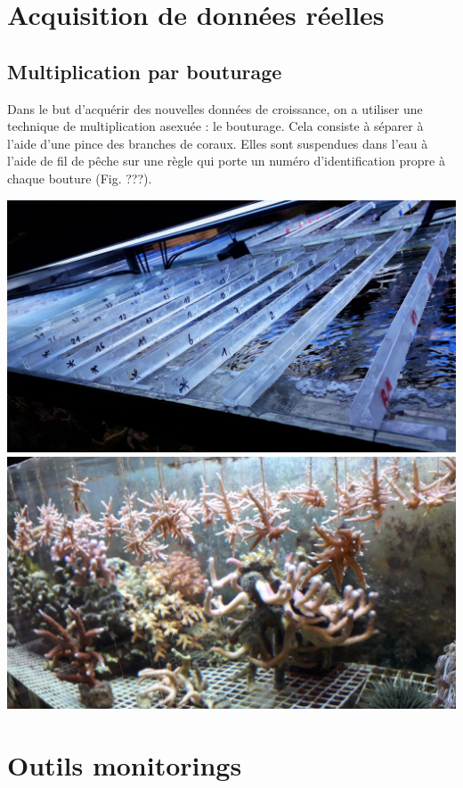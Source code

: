 \documentclass[]{report}
\begin{document}
\section{Acquisition de données
réelles}\label{acquisition-de-donnees-reelles}

\subsection{Multiplication par
bouturage}\label{multiplication-par-bouturage}

Dans le but d'acquérir des nouvelles données de croissance, on a
utiliser une technique de multiplication asexuée : le bouturage. Cela
consiste à séparer à l'aide d'une pince des branches de coraux. Elles
sont suspendues dans l'eau à l'aide de fil de pêche sur une règle qui
porte un numéro d'identification propre à chaque bouture (Fig. ???).

\includegraphics{../image/regle.jpg}
\includegraphics{../image/boutures.jpg}

\section{Outils monitorings}\label{outils-monitorings}
\end{document}
